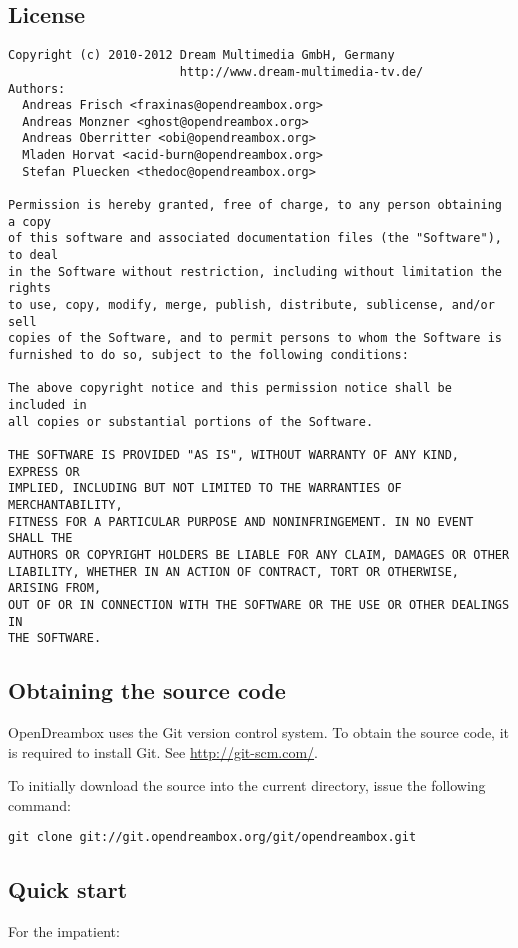 \documentclass[a4paper]{article}
\newcommand{\shell}[1]{\texttt{\small #1}}
\begin{document}
  \subsection{License}

    \begin{verbatim}
Copyright (c) 2010-2012 Dream Multimedia GmbH, Germany
                        http://www.dream-multimedia-tv.de/
Authors:
  Andreas Frisch <fraxinas@opendreambox.org>
  Andreas Monzner <ghost@opendreambox.org>
  Andreas Oberritter <obi@opendreambox.org>
  Mladen Horvat <acid-burn@opendreambox.org>
  Stefan Pluecken <thedoc@opendreambox.org>

Permission is hereby granted, free of charge, to any person obtaining a copy
of this software and associated documentation files (the "Software"), to deal
in the Software without restriction, including without limitation the rights
to use, copy, modify, merge, publish, distribute, sublicense, and/or sell
copies of the Software, and to permit persons to whom the Software is
furnished to do so, subject to the following conditions:

The above copyright notice and this permission notice shall be included in
all copies or substantial portions of the Software.

THE SOFTWARE IS PROVIDED "AS IS", WITHOUT WARRANTY OF ANY KIND, EXPRESS OR
IMPLIED, INCLUDING BUT NOT LIMITED TO THE WARRANTIES OF MERCHANTABILITY,
FITNESS FOR A PARTICULAR PURPOSE AND NONINFRINGEMENT. IN NO EVENT SHALL THE
AUTHORS OR COPYRIGHT HOLDERS BE LIABLE FOR ANY CLAIM, DAMAGES OR OTHER
LIABILITY, WHETHER IN AN ACTION OF CONTRACT, TORT OR OTHERWISE, ARISING FROM,
OUT OF OR IN CONNECTION WITH THE SOFTWARE OR THE USE OR OTHER DEALINGS IN
THE SOFTWARE.
    \end{verbatim}

  \subsection{Obtaining the source code}
    OpenDreambox uses the Git version control system. To obtain the source
    code, it is required to install Git. See \url{http://git-scm.com/}.

    To initially download the source into the current directory, issue the
    following command:

    \shell{git clone git://git.opendreambox.org/git/opendreambox.git}

  \subsection{Quick start}
    For the impatient:
\end{document}
